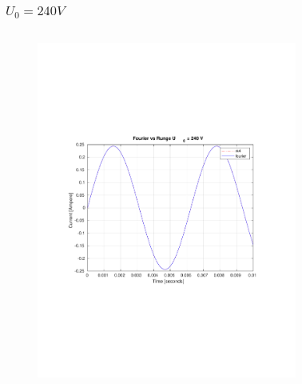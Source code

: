 \documentclass[aspectratio=1610]{beamer}
\begin{document}
\begin{frame}
\frametitle{$U_{0}= 240V$}
	\begin{columns}
			\begin{figure}
				\includegraphics[scale=0.4]{figs/fourier vs rk4 240.pdf}
			\end{figure}
			\begin{figure}

\end{figure}
\end{columns}
\end{frame}
\end{document}
